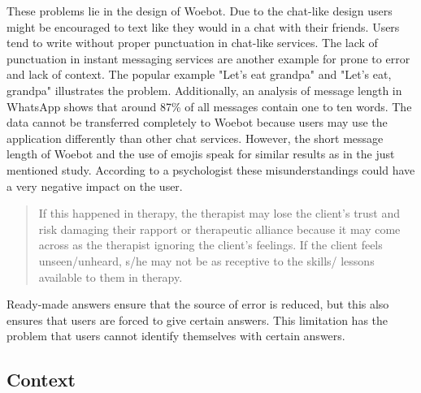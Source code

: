 These problems lie in the design of Woebot.
Due to the chat-like design users might be encouraged to text like they would in a chat with their friends.
Users tend to write without proper punctuation in chat-like services\cite{punctuation}.
The lack of punctuation in instant messaging services are another example for prone to error and lack of context.
The popular example "Let's eat grandpa" and "Let's eat, grandpa" illustrates the problem.
Additionally, an analysis of message length in WhatsApp shows that around 87\% of all messages contain one to ten words\cite{whatsapp-usage}.
The data cannot be transferred completely to Woebot because users may use the application differently than other chat services.
However, the short message length of Woebot and the use of emojis speak for similar results as in the just mentioned study.
According to a psychologist these misunderstandings could have a very negative impact on the user.

\begin{quote}
    If this happened in therapy, the therapist may lose the client's trust and risk damaging their rapport or therapeutic alliance because it may come across as the therapist ignoring the client's feelings.
    If the client feels unseen/unheard, s/he may not be as receptive to the skills/ lessons available to them in therapy\cite{investigating-students}.
\end{quote}

Ready-made answers ensure that the source of error is reduced, but this also ensures that users are forced to give certain answers.
This limitation has the problem that users cannot identify themselves with certain answers\cite{emoticons}.













\subsection{Context}

